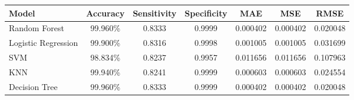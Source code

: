 \begin{tabular}{lcccccc}
\toprule
Model & Accuracy & Sensitivity & Specificity & MAE & MSE & RMSE \\ \midrule
Random Forest & 99.960\% & 0.8333 & 0.9999 & 0.000402 & 0.000402 & 0.020048 \\
Logistic Regression & 99.900\% & 0.8316 & 0.9998 & 0.001005 & 0.001005 & 0.031699 \\
SVM & 98.834\% & 0.8237 & 0.9957 & 0.011656 & 0.011656 & 0.107963 \\
KNN & 99.940\% & 0.8241 & 0.9999 & 0.000603 & 0.000603 & 0.024554 \\
Decision Tree & 99.960\% & 0.8333 & 0.9999 & 0.000402 & 0.000402 & 0.020048 \\
\bottomrule
\end{tabular}
